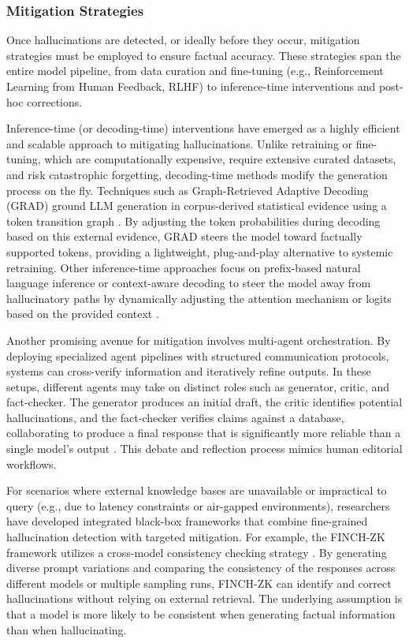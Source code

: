 \documentclass[11pt,a4paper]{article}
\begin{document}
\subsubsection{Mitigation Strategies}

Once hallucinations are detected, or ideally before they occur, mitigation strategies must be employed to ensure factual accuracy. These strategies span the entire model pipeline, from data curation and fine-tuning (e.g., Reinforcement Learning from Human Feedback, RLHF) to inference-time interventions and post-hoc corrections.

Inference-time (or decoding-time) interventions have emerged as a highly efficient and scalable approach to mitigating hallucinations. Unlike retraining or fine-tuning, which are computationally expensive, require extensive curated datasets, and risk catastrophic forgetting, decoding-time methods modify the generation process on the fly. Techniques such as Graph-Retrieved Adaptive Decoding (GRAD) ground LLM generation in corpus-derived statistical evidence using a token transition graph \cite{Nguyen_2025_Grad}. By adjusting the token probabilities during decoding based on this external evidence, GRAD steers the model toward factually supported tokens, providing a lightweight, plug-and-play alternative to systemic retraining. Other inference-time approaches focus on prefix-based natural language inference or context-aware decoding to steer the model away from hallucinatory paths by dynamically adjusting the attention mechanism or logits based on the provided context \cite{Chen_2025_Context, Harary_2025_Prefixnli}.

Another promising avenue for mitigation involves multi-agent orchestration. By deploying specialized agent pipelines with structured communication protocols, systems can cross-verify information and iteratively refine outputs. In these setups, different agents may take on distinct roles such as generator, critic, and fact-checker. The generator produces an initial draft, the critic identifies potential hallucinations, and the fact-checker verifies claims against a database, collaborating to produce a final response that is significantly more reliable than a single model's output \cite{Gosmar_2025_AI}. This debate and reflection process mimics human editorial workflows.

For scenarios where external knowledge bases are unavailable or impractical to query (e.g., due to latency constraints or air-gapped environments), researchers have developed integrated black-box frameworks that combine fine-grained hallucination detection with targeted mitigation. For example, the FINCH-ZK framework utilizes a cross-model consistency checking strategy \cite{Goel_2025_LLM}. By generating diverse prompt variations and comparing the consistency of the responses across different models or multiple sampling runs, FINCH-ZK can identify and correct hallucinations without relying on external retrieval. The underlying assumption is that a model is more likely to be consistent when generating factual information than when hallucinating.
\end{document}
